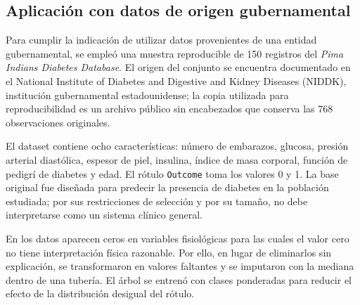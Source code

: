 \documentclass[14pt,twoside]{article}
\begin{document}
\subsection{Aplicación con datos de origen gubernamental}

Para cumplir la indicación de utilizar datos provenientes de una entidad gubernamental, se empleó una muestra reproducible de 150 registros del \textit{Pima Indians Diabetes Database}. El origen del conjunto se encuentra documentado en el National Institute of Diabetes and Digestive and Kidney Diseases (NIDDK), institución gubernamental estadounidense; la copia utilizada para reproducibilidad es un archivo público sin encabezados que conserva las 768 observaciones originales. \cite{pimaNIDDK,pimaRaw}

El dataset contiene ocho características: número de embarazos, glucosa, presión arterial diastólica, espesor de piel, insulina, índice de masa corporal, función de pedigrí de diabetes y edad. El rótulo \texttt{Outcome} toma los valores 0 y 1. La base original fue diseñada para predecir la presencia de diabetes en la población estudiada; por sus restricciones de selección y por su tamaño, no debe interpretarse como un sistema clínico general. \cite{pimaPaper,pimaNIDDK}

En los datos aparecen ceros en variables fisiológicas para las cuales el valor cero no tiene interpretación física razonable. Por ello, en lugar de eliminarlos sin explicación, se transformaron en valores faltantes y se imputaron con la mediana dentro de una tubería. El árbol se entrenó con clases ponderadas para reducir el efecto de la distribución desigual del rótulo.
\end{document}
